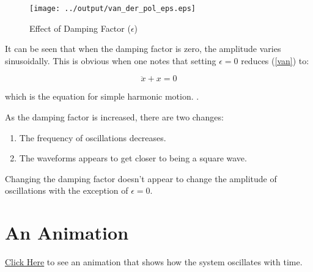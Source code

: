 \documentclass[12pt]{article}
\begin{document}
\begin{figure}[H]
  \centering
  \texttt{[image: ../output/van\_der\_pol\_eps.eps]}
  \caption{Effect of Damping Factor ($\epsilon$)}
  \label{fig:eps}
\end{figure}


It can be seen that when the damping factor is zero, the amplitude
varies sinusoidally. This is obvious when one notes that setting
$\epsilon = 0$ reduces (\ref{van}) to:

\begin{equation}
\ddot{x} + x = 0
\end{equation}

which is the equation for simple harmonic motion. \cite{shm}.

As the damping factor is increased, there are two changes:

\begin{enumerate}
\item The frequency of oscillations decreases.
\item The waveforms appears to get closer to being a square wave.
\end{enumerate}

Changing the damping factor doesn't appear to change the amplitude of
oscillations with the exception of $\epsilon = 0$.

\section{An Animation}

\href{143079021.html}{Click Here} to see an animation that
shows how the system oscillates with time.



\end{document}
